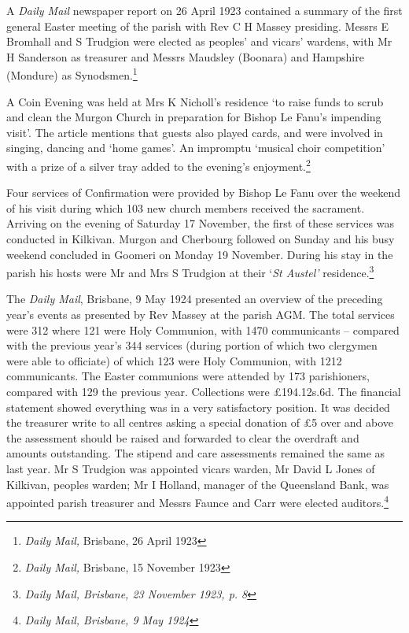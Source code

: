 A \emph{Daily Mail} newspaper report on 26 April 1923 contained a summary of the first general Easter meeting of the parish with Rev C H Massey presiding. Messrs E Bromhall and S Trudgion were elected as peoples' and vicars' wardens, with Mr H Sanderson as treasurer and Messrs Maudsley (Boonara) and Hampshire (Mondure) as Synodsmen.\footnote{\emph{Daily Mail,} Brisbane, 26 April 1923}


A Coin Evening was held at Mrs K Nicholl's residence `to raise funds to scrub and clean the Murgon Church in preparation for Bishop Le Fanu's impending visit'. The article mentions that guests also played cards, and were involved in singing, dancing and `home games'. An impromptu `musical choir competition' with a prize of a silver tray added to the evening's enjoyment.\footnote{\emph{Daily Mail,} Brisbane, 15 November 1923}


Four services of Confirmation were provided by Bishop Le Fanu over the weekend of his visit during which 103 new church members received the sacrament. Arriving on the evening of Saturday 17 November, the first of these services was conducted in Kilkivan. Murgon and Cherbourg followed on Sunday and his busy weekend concluded in Goomeri on Monday 19 November. During his stay in the parish his hosts were Mr and Mrs S Trudgion at their `\emph{St Austel'} residence.\footnote{\emph{Daily Mail, Brisbane, 23 November 1923, p. 8}}


The \emph{Daily Mail}, Brisbane, 9 May 1924 presented an overview of the preceding year's events as presented by Rev Massey at the parish AGM. The total services were 312 where 121 were Holy Communion, with 1470 communicants -- compared with the previous year's 344 services (during portion of which two clergymen were able to officiate) of which 123 were Holy Communion, with 1212 communicants. The Easter communions were attended by 173 parishioners, compared with 129 the previous year. Collections were \pounds194.12s.6d. The financial statement showed everything was in a very satisfactory position. It was decided the treasurer write to all centres asking a special donation of \pounds5 over and above the assessment should be raised and forwarded to clear the overdraft and amounts outstanding. The stipend and care assessments remained the same as last year. Mr S Trudgion was appointed vicars warden, Mr David L Jones of Kilkivan, peoples warden; Mr I Holland, manager of the Queensland Bank, was appointed parish treasurer and Messrs Faunce and Carr were elected auditors.\footnote{\emph{Daily Mail, Brisbane, 9 May 1924}}


